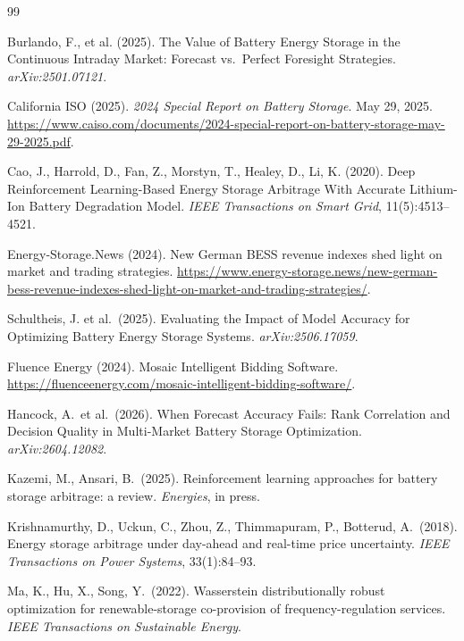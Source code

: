 \documentclass[11pt]{article}
\begin{document}

\begin{thebibliography}{99}

Burlando, F., et al. (2025). The Value of Battery Energy Storage in the Continuous Intraday Market: Forecast vs.\ Perfect Foresight Strategies. \emph{arXiv:2501.07121}.

California ISO (2025). \emph{2024 Special Report on Battery Storage}. May 29, 2025. \url{https://www.caiso.com/documents/2024-special-report-on-battery-storage-may-29-2025.pdf}.

Cao, J., Harrold, D., Fan, Z., Morstyn, T., Healey, D., Li, K. (2020). Deep Reinforcement Learning-Based Energy Storage Arbitrage With Accurate Lithium-Ion Battery Degradation Model. \emph{IEEE Transactions on Smart Grid}, 11(5):4513--4521.

Energy-Storage.News (2024). New German BESS revenue indexes shed light on market and trading strategies. \url{https://www.energy-storage.news/new-german-bess-revenue-indexes-shed-light-on-market-and-trading-strategies/}.

Schultheis, J. et al.\ (2025). Evaluating the Impact of Model Accuracy for Optimizing Battery Energy Storage Systems. \emph{arXiv:2506.17059}.

Fluence Energy (2024). Mosaic Intelligent Bidding Software. \url{https://fluenceenergy.com/mosaic-intelligent-bidding-software/}.

Hancock, A.\ et al.\ (2026). When Forecast Accuracy Fails: Rank Correlation and Decision Quality in Multi-Market Battery Storage Optimization. \emph{arXiv:2604.12082}.

Kazemi, M., Ansari, B.\ (2025). Reinforcement learning approaches for battery storage arbitrage: a review. \emph{Energies}, in press.

Krishnamurthy, D., Uckun, C., Zhou, Z., Thimmapuram, P., Botterud, A.\ (2018). Energy storage arbitrage under day-ahead and real-time price uncertainty. \emph{IEEE Transactions on Power Systems}, 33(1):84--93.

Ma, K., Hu, X., Song, Y.\ (2022). Wasserstein distributionally robust optimization for renewable-storage co-provision of frequency-regulation services. \emph{IEEE Transactions on Sustainable Energy}.


\end{thebibliography}
\end{document}
